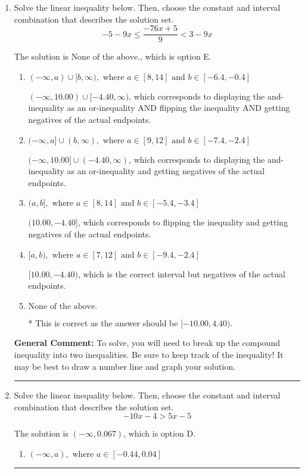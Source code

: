 \documentclass{extbook}[14pt]
\newcommand{\litem}[1]{\item #1

\rule{\textwidth}{0.4pt}}
\begin{document}
\begin{enumerate}\litem{
Solve the linear inequality below. Then, choose the constant and interval combination that describes the solution set.
\[ -5 - 9 x \leq \frac{-76 x + 5}{9} < 3 - 9 x \]

The solution is \( \text{None of the above.} \), which is option E.\begin{enumerate}[label=\Alph*.]
\item \( (-\infty, a) \cup [b, \infty), \text{ where } a \in [8, 14] \text{ and } b \in [-6.4, -0.4] \)

$(-\infty, 10.00) \cup [-4.40, \infty)$, which corresponds to displaying the and-inequality as an or-inequality AND flipping the inequality AND getting negatives of the actual endpoints.
\item \( (-\infty, a] \cup (b, \infty), \text{ where } a \in [9, 12] \text{ and } b \in [-7.4, -2.4] \)

$(-\infty, 10.00] \cup (-4.40, \infty)$, which corresponds to displaying the and-inequality as an or-inequality and getting negatives of the actual endpoints.
\item \( (a, b], \text{ where } a \in [8, 14] \text{ and } b \in [-5.4, -3.4] \)

$(10.00, -4.40]$, which corresponds to flipping the inequality and getting negatives of the actual endpoints.
\item \( [a, b), \text{ where } a \in [7, 12] \text{ and } b \in [-9.4, -2.4] \)

$[10.00, -4.40)$, which is the correct interval but negatives of the actual endpoints.
\item \( \text{None of the above.} \)

* This is correct as the answer should be $[-10.00, 4.40)$.
\end{enumerate}

\textbf{General Comment:} To solve, you will need to break up the compound inequality into two inequalities. Be sure to keep track of the inequality! It may be best to draw a number line and graph your solution.
}
\litem{
Solve the linear inequality below. Then, choose the constant and interval combination that describes the solution set.
\[ -10x -4 > 5x -5 \]

The solution is \( (-\infty, 0.067) \), which is option D.\begin{enumerate}[label=\Alph*.]
\item \( (-\infty, a), \text{ where } a \in [-0.44, 0.04] \)


\end{enumerate}}
\end{enumerate}
\end{document}
